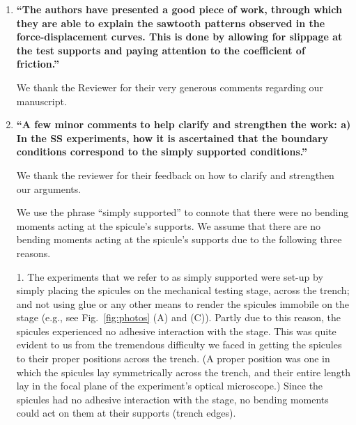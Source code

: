 \documentclass[11pt,letterpaper]{report}
\begin{document}
\begin{enumerate}[label=\textit{1.\arabic*},wide, labelwidth=!, labelindent=0pt]

\item \label{r1c1} {\bf ``The authors have presented a good piece of work, through which they are able to explain the sawtooth patterns observed in the force-displacement curves. This is done by allowing for slippage at the test supports and paying attention to the coefficient of friction.''}



We thank the Reviewer for their very generous comments regarding our manuscript.

\newpage
\item \label{r1c2} {\bf ``A few minor comments to help clarify and strengthen the work: a) In the SS experiments, how it is ascertained that the boundary conditions correspond to the simply supported conditions.''}


We thank the reviewer for their feedback on how to clarify and strengthen our arguments.


We use the phrase ``simply supported'' to connote that there were no bending moments acting at the spicule's supports. We assume that there are no bending moments acting at the spicule's supports due to the following three reasons.

1. The experiments that we refer to as simply supported were set-up by simply placing the spicules on the mechanical testing stage, across the trench; and not using glue or any other means to render the spicules immobile on the stage (e.g., see Fig.~\ref{fig:photos} (A) and (C)). Partly due to this reason, the spicules experienced no adhesive interaction with the stage. This was  quite evident to us from the  tremendous difficulty we faced in getting the spicules to their proper positions across the trench. (A proper position was one in which
the spicules lay symmetrically across the trench, and their entire length lay in the focal plane of the experiment's optical microscope.)  Since the spicules had no adhesive interaction with the stage, no bending moments could act on them at their supports (trench edges).


\end{enumerate}
\end{document}
